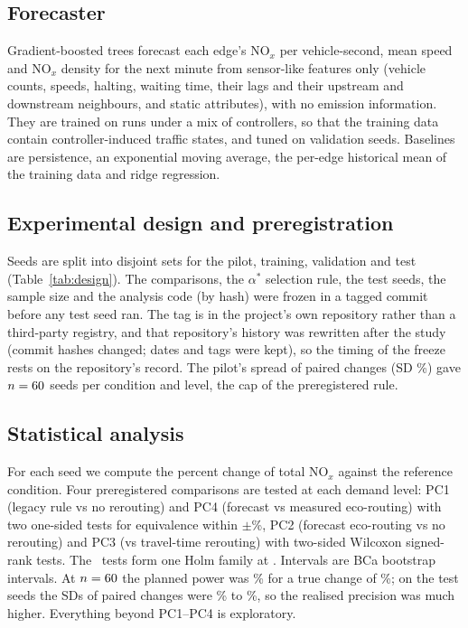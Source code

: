 \documentclass[11pt]{article}
\begin{document}
\subsection{Forecaster}
Gradient-boosted trees forecast each edge's NO$_x$ per vehicle-second, mean speed and NO$_x$ density for the next
minute from sensor-like features only (vehicle counts, speeds, halting, waiting time, their lags and their upstream
and downstream neighbours, and static attributes), with no emission information. They are trained on runs under a
mix of controllers, so that the training data contain controller-induced traffic states, and tuned on validation
seeds. Baselines are persistence, an exponential moving average, the per-edge historical mean of the training data
and ridge regression.

\subsection{Experimental design and preregistration}
Seeds are split into disjoint sets for the pilot, training, validation and test (Table~\ref{tab:design}). The
comparisons, the $\alpha^*$ selection rule, the test seeds, the sample size and the analysis code (by hash) were
frozen in a tagged commit before any test seed ran. The tag is in the project's own repository rather than a
third-party registry, and that repository's history was rewritten after the study (commit hashes changed; dates
and tags were kept), so the timing of the freeze rests on the repository's record. The pilot's spread of paired changes (SD \PilotSD\%) gave
$n = 60$ seeds per condition and level, the cap of the preregistered rule.

\begin{table}[htbp]
\centering\small
\caption{Experiments. Seed sets are disjoint across roles; the sensitivity experiment reuses the test seed numbers on
the recoded network, with demand generated for that network.}
\label{tab:design}

\end{table}

\subsection{Statistical analysis}
For each seed we compute the percent change of total NO$_x$ against the reference condition. Four preregistered
comparisons are tested at each demand level: PC1 (legacy rule vs no rerouting) and PC4 (forecast vs measured
eco-routing) with two one-sided tests for equivalence within $\pm$\SESOI\%, PC2 (forecast eco-routing vs no
rerouting) and PC3 (vs travel-time rerouting) with two-sided Wilcoxon signed-rank tests. The \TestsInFamily\ tests
form one Holm family at \FamilywiseAlpha. Intervals are BCa bootstrap intervals. At $n = 60$ the planned
power was \PowerAtNSup\% for a true change of \SESOI\%; on the test seeds the SDs of paired changes were
\ObservedSDMin\% to \ObservedSDMax\%, so the realised precision was much higher. Everything beyond PC1--PC4 is
exploratory.
\end{document}
